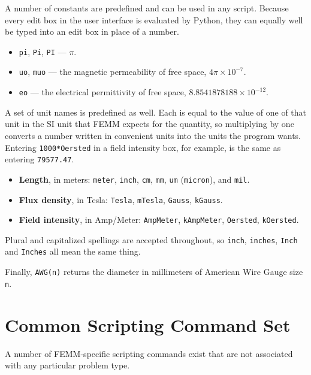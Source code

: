A number of constants are predefined and can be used in any script.
Because every edit box in the user interface is evaluated by Python, they
can equally well be typed into an edit box in place of a number.

\begin{itemize}
\item{\tt pi}, {\tt Pi}, {\tt PI} --- $\pi$.
\item{\tt uo}, {\tt muo} --- the magnetic permeability of free space,
$4 \pi \times 10^{-7}$.
\item{\tt eo} --- the electrical permittivity of free space,
$8.8541878188 \times 10^{-12}$.
\end{itemize}

A set of unit names is predefined as well.  Each is equal to the value of
one of that unit in the SI unit that FEMM expects for the quantity, so
multiplying by one converts a number written in convenient units into the
units the program wants.  Entering {\tt 1000*Oersted} in a field
intensity box, for example, is the same as entering {\tt 79577.47}.

\begin{itemize}
\item{\bf Length}, in meters: {\tt meter}, {\tt inch}, {\tt cm},
{\tt mm}, {\tt um} ({\tt micron}), and {\tt mil}.
\item{\bf Flux density}, in Tesla: {\tt Tesla}, {\tt mTesla},
{\tt Gauss}, {\tt kGauss}.
\item{\bf Field intensity}, in Amp/Meter: {\tt AmpMeter},
{\tt kAmpMeter}, {\tt Oersted}, {\tt kOersted}.
\end{itemize}

Plural and capitalized spellings are accepted throughout, so
{\tt inch}, {\tt inches}, {\tt Inch} and {\tt Inches} all mean the same
thing.

Finally, {\tt AWG(n)} returns the diameter in millimeters of American
Wire Gauge size {\tt n}.

\section{Common Scripting Command Set}

A number of FEMM-specific scripting commands exist that are not
associated with any particular problem type.

